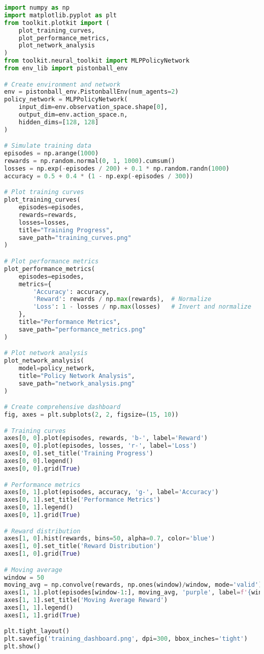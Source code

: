 \begin{lstlisting}[language=python, caption=Training Visualization]
import numpy as np
import matplotlib.pyplot as plt
from toolkit.plotkit import (
    plot_training_curves,
    plot_performance_metrics,
    plot_network_analysis
)
from toolkit.neural_toolkit import MLPPolicyNetwork
from env_lib import pistonball_env

# Create environment and network
env = pistonball_env.PistonballEnv(num_agents=2)
policy_network = MLPPolicyNetwork(
    input_dim=env.observation_space.shape[0],
    output_dim=env.action_space.n,
    hidden_dims=[128, 128]
)

# Simulate training data
episodes = np.arange(1000)
rewards = np.random.normal(0, 1, 1000).cumsum()
losses = np.exp(-episodes / 200) + 0.1 * np.random.randn(1000)
accuracy = 0.5 + 0.4 * (1 - np.exp(-episodes / 300))

# Plot training curves
plot_training_curves(
    episodes=episodes,
    rewards=rewards,
    losses=losses,
    title="Training Progress",
    save_path="training_curves.png"
)

# Plot performance metrics
plot_performance_metrics(
    episodes=episodes,
    metrics={
        'Accuracy': accuracy,
        'Reward': rewards / np.max(rewards),  # Normalize
        'Loss': 1 - losses / np.max(losses)   # Invert and normalize
    },
    title="Performance Metrics",
    save_path="performance_metrics.png"
)

# Plot network analysis
plot_network_analysis(
    model=policy_network,
    title="Policy Network Analysis",
    save_path="network_analysis.png"
)

# Create comprehensive dashboard
fig, axes = plt.subplots(2, 2, figsize=(15, 10))

# Training curves
axes[0, 0].plot(episodes, rewards, 'b-', label='Reward')
axes[0, 0].plot(episodes, losses, 'r-', label='Loss')
axes[0, 0].set_title('Training Progress')
axes[0, 0].legend()
axes[0, 0].grid(True)

# Performance metrics
axes[0, 1].plot(episodes, accuracy, 'g-', label='Accuracy')
axes[0, 1].set_title('Performance Metrics')
axes[0, 1].legend()
axes[0, 1].grid(True)

# Reward distribution
axes[1, 0].hist(rewards, bins=50, alpha=0.7, color='blue')
axes[1, 0].set_title('Reward Distribution')
axes[1, 0].grid(True)

# Moving average
window = 50
moving_avg = np.convolve(rewards, np.ones(window)/window, mode='valid')
axes[1, 1].plot(episodes[window-1:], moving_avg, 'purple', label=f'{window}-episode moving average')
axes[1, 1].set_title('Moving Average Reward')
axes[1, 1].legend()
axes[1, 1].grid(True)

plt.tight_layout()
plt.savefig('training_dashboard.png', dpi=300, bbox_inches='tight')
plt.show()
\end{lstlisting}

